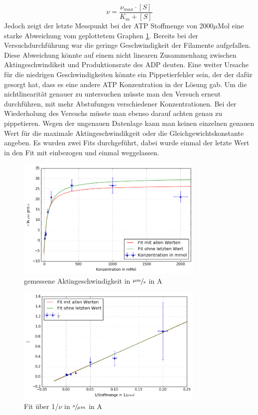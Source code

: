\begin{equation}
  \nu = \frac{\nu_{max} \cdot [S]}{K_m + [S]}
  \label{equ:michaelis_menten}
\end{equation}
Jedoch zeigt der letzte Messpunkt bei der ATP Stoffmenge von 2000$\mu \text{Mol}$ eine starke
Abweichung vom geplottetem Graphen \ref{fig:normal_speed}.
Bereits bei der Versuchdurchführung war die geringe Geschwindigkeit der Filamente aufgefallen.
Diese Abweichung könnte auf einem nicht linearen Zusammenhang zwischen
Aktingeschwindikeit und Produktionsrate des ADP deuten.
Eine weiter Ursache für die niedrigen Geschwindigkeiten könnte ein Pippetierfehler sein,
der der dafür gesorgt hat, dass es eine andere ATP Konzentration in der Lösung gab. 
Um die nichtlinearität genauer zu untersuchen müsste man den Versuch erneut durchführen,
mit mehr Abstufungen verschiedener Konzentrationen.
Bei der Wiederholung des Versuchs müsste man ebenso darauf achten genau zu pippetieren.
Wegen der ungenauen Datenlage kann man keinen einzelnen genauen Wert für die maximale
Aktingeschwindikgeit oder die Gleichgewichtskonstante angeben.
Es wurden zwei Fits durchgeführt, dabei wurde einmal der letzte Wert in den Fit mit einbezogen und einmal weggelassen. 
\begin{figure}[]
  \centering
  \includegraphics[width=0.8\textwidth]{bilder/both_fits.png}
  \caption{gemessene Aktingeschwindigkeit in $\sfrac{\mu m}{s}$ in A}
  \label{fig:normal_speed}
\end{figure}

\begin{figure}[]
  \centering
  \includegraphics[width=0.8\textwidth]{bilder/both_fits_1over.png}
  \caption{Fit über 1/$\nu$  in $\sfrac{s}{\mu m}$ in A}
  \label{fig:1_over_speed}
\end{figure}

